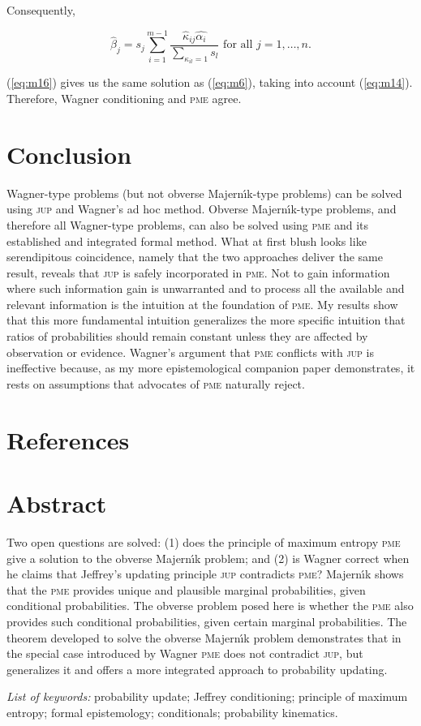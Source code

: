 \documentclass[11pt]{article}
\begin{document}
Consequently,

\begin{equation}
  \label{eq:m16}
  \hat{\beta}_{j}=s_{j}\sum_{i=1}^{m-1}\frac{\hat{\kappa}_{ij}\hat{\alpha_{i}}}{\sum_{\kappa_{il}=1}s_{l}}\mbox{ for all }j=1,\ldots,n.
\end{equation}

(\ref{eq:m16}) gives us the same solution as (\ref{eq:m6}), taking
into account (\ref{eq:m14}). Therefore, Wagner conditioning and
\textsc{pme} agree.

\section{Conclusion}
\label{Conclusion}

Wagner-type problems (but not obverse Majern{\'\i}k-type problems) can be
solved using \textsc{jup} and Wagner's ad hoc method. Obverse
Majern{\'\i}k-type problems, and therefore all Wagner-type problems, can
also be solved using \textsc{pme} and its established and integrated
formal method. What at first blush looks like serendipitous
coincidence, namely that the two approaches deliver the same result,
reveals that \textsc{jup} is safely incorporated in \textsc{pme}. Not
to gain information where such information gain is unwarranted and to
process all the available and relevant information is the intuition at
the foundation of \textsc{pme}. My results show that this more
fundamental intuition generalizes the more specific intuition that
ratios of probabilities should remain constant unless they are
affected by observation or evidence. Wagner's argument that
\textsc{pme} conflicts with \textsc{jup} is ineffective because, as my
more epistemological companion paper demonstrates, it rests on
assumptions that advocates of \textsc{pme} naturally reject.

\section{References}
\label{References}


% 


\section{Abstract}
\label{Abstract}

{\noindent}Two open questions are solved: (1) does the principle of
maximum entropy \textsc{pme} give a solution to the obverse
Majern{\'\i}k problem; and (2) is Wagner correct when he claims that
Jeffrey's updating principle \textsc{jup} contradicts \textsc{pme}?
Majern{\'\i}k shows that the \textsc{pme} provides unique and
plausible marginal probabilities, given conditional probabilities. The
obverse problem posed here is whether the \textsc{pme} also provides
such conditional probabilities, given certain marginal probabilities.
The theorem developed to solve the obverse Majern{\'\i}k problem
demonstrates that in the special case introduced by Wagner
\textsc{pme} does not contradict \textsc{jup}, but generalizes it and
offers a more integrated approach to probability updating.

{\noindent}\emph{List of keywords:} probability update; Jeffrey
conditioning; principle of maximum entropy; formal epistemology;
conditionals; probability kinematics.
\end{document}

